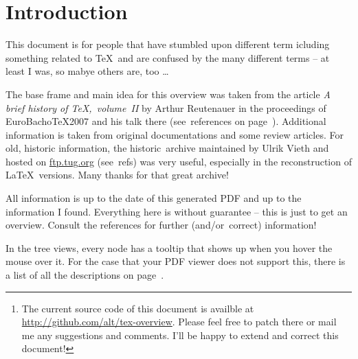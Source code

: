 


\begin{abstract}
In the world of \TeX, there are many developments and ambiguous names. This paper tries to give an overview of the development of \TeX\ and related programs. Contributions are very welcome!\footnote{The current source code of this document is availble at \url{http://github.com/alt/tex-overview}. Please feel free to patch there or mail me any suggestions and comments. I'll be happy to extend and correct this document!}

{\centering \Large \hyperref[textextview]{Link for the impatient.}\\[2ex]}
\end{abstract}

\section*{Introduction}
This document is for people that have stumbled upon different term icluding something related to \TeX\ and are confused by the many different terms – at least I was, so mabye others are, too … 

The base frame and main idea for this overview was taken from the article \textit{A brief history of \TeX,~volume~II} by Arthur Reutenauer in the proceedings of \textsf{EuroBacho\TeX 2007} and his talk there (see~references on page~\pageref{sec:refs}). Additional information is taken from original documentations and some review articles. For old, historic information, the \textsf{historic~archive} maintained by Ulrik Vieth and hosted on \url{ftp.tug.org} (see~refs) was very useful, especially in the reconstruction of \LaTeX\ versions. Many thanks for that great archive!

All information is up to the date of this generated PDF and up to the information I found. Everything here is without guarantee – this is just to get an overview. Consult the references for further (and/or~correct) information! 

In the tree views, every node has a tooltip that shows up when you hover the mouse over it. For the case that your PDF viewer does not support this, there is a list of all the descriptions on page~\pageref{sec:text}.

